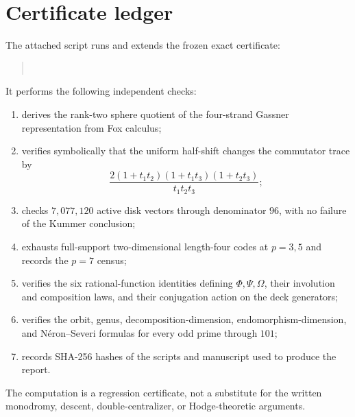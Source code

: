 \documentclass[11pt]{article}
\theoremstyle{definition}
\theoremstyle{remark}
\begin{document}
\appendix
\section{Certificate ledger}

The attached script runs and extends the frozen exact certificate:
\begin{quote}\small
{}\\
\end{quote}
It performs the following independent checks:
\begin{enumerate}
\item derives the rank-two sphere quotient of the four-strand Gassner representation from Fox calculus;
\item verifies symbolically that the uniform half-shift changes the commutator trace by
\[
 \frac{2(1+t_1t_2)(1+t_1t_3)(1+t_2t_3)}{t_1t_2t_3};
\]
\item checks $7{,}077{,}120$ active disk vectors through denominator $96$, with no failure of the Kummer conclusion;
\item exhausts full-support two-dimensional length-four codes at $p=3,5$ and records the $p=7$ census;
\item verifies the six rational-function identities defining $\Phi,\Psi,\Omega$, their involution and composition laws, and their conjugation action on the deck generators;
\item verifies the orbit, genus, decomposition-dimension, endomorphism-dimension, and N\'eron--Severi formulas for every odd prime through $101$;
\item records SHA-256 hashes of the scripts and manuscript used to produce the report.
\end{enumerate}
The computation is a regression certificate, not a substitute for the written monodromy, descent, double-centralizer, or Hodge-theoretic arguments.
\end{document}
